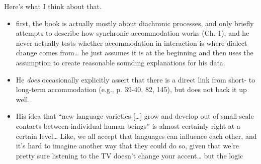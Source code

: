 Here's what I think about that.

\begin{itemize}    
    \item first, the book is actually mostly about diachronic processes, and only briefly attempts to describe how synchronic accommodation works (Ch. 1), and he never actually tests whether accommodation in interaction is where dialect change comes from\ldots{} he just assumes it is at the beginning and then uses the assumption to create reasonable sounding explanations for his data.
    \item He \emph{does} occasionally explicitly assert that there is a direct link from short- to long-term accommodation (e.g., p. 39-40, 82, 145), but does not back it up well.
    \item His idea that ``new language varieties [\ldots{}] grow and develop out of small-scale contacts between individual human beings'' is almost certainly right at a certain level\ldots{} Like, we all accept that languages can influence each other, and it's hard to imagine another way that they could do so, given that we're pretty sure listening to the TV doesn't change your accent\ldots{} but the logic
\end{itemize}

